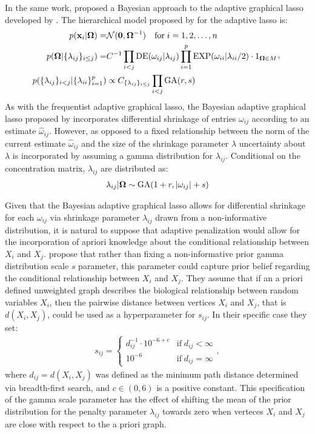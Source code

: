 \begin{DoubleSpace*}
In the same work, \cite{wang2012} proposed a Bayesian approach to the adaptive graphical lasso developed by \cite{fan2009}. The hierarchical model proposed by for the adaptive lasso is:
\begin{align}
p(\mathbf{x}_i|\boldsymbol{\Omega}) = & \mathcal{N}(\mathbf{0,\boldsymbol{\Omega}}^{-1}) \quad \text{for} \; i=1,2,\hdots,n\\
p(\boldsymbol{\Omega}|\{\lambda_{ij}\}_{i\leq j}) = & C^{-1} \prod_{i<j} \operatorname{DE}(\omega_{ij}|\lambda_{ij}) \prod_{i=1}^{p} \operatorname{EXP} (\omega_{ii} | \lambda_{ii} / 2) \cdot 1_{\boldsymbol{\Omega}\in M^+}\\
p(\{\lambda_{ij}\}_{i<j}|\{\lambda_{ii}\}_{i=1}^p) &\propto C_{\{\lambda_{ij}\}_{i\leq j}} \prod_{i<j} \operatorname{GA}(r,s)
\end{align}
As with the frequentist adaptive graphical lasso, the Bayesian adaptive graphical lasso proposed by \cite{wang2012} incorporates differential shrinkage of entries $\omega_{ij}$ according to an estimate $\hat{\omega}_{ij}$. However, as opposed to a fixed relationship between the norm of the current estimate $\hat{\omega}_{ij}$ and the size of the shrinkage parameter $\lambda$ uncertainty about $\lambda$ is incorporated by assuming a gamma distribution for $\lambda_{ij}$. Conditional on the concentration matrix, $\lambda_{ij}$ are distributed as:
\begin{align}
\lambda_{ij}|\boldsymbol{\Omega}\sim \operatorname{GA}(1+r,|\omega_{ij}|+s)
\end{align}

Given that the Bayesian adaptive graphical lasso allows for differential shrinkage for each $\omega_{ij}$ via shrinkage parameter $\lambda_{ij}$ drawn from a non-informative distribution, it is natural to suppose that adaptive penalization would allow for the incorporation of apriori knowledge about the conditional relationship between $X_i$ and $X_j$. \cite{peterson2013} propose that rather than fixing a non-informative prior gamma distribution scale $s$ parameter, this parameter could capture prior belief regarding the conditional relationship between $X_i$ and $X_j$. They assume that if an a priori defined unweighted graph describes the biological relationship between random variables $X_i$, then  the pairwise distance between vertices $X_i$ and $X_j$, that is $d(X_i,X_j)$, could be used as a hyperparameter for $s_{ij}$. In their specific case they set:
\begin{align}
s_{ij}=
\begin{cases} 
d_{ij}^{-1} \cdot  10^{-6+c} & \text{if} \; d_{ij}<\infty \\
10^{-6} & \text{if} \; d_{ij}=\infty
\end{cases},
\end{align}
where $d_{ij}=d(X_i,X_j)$ was defined as the minimum path distance determined via breadth-first search, and $c\in (0,6)$ is a positive constant. This specification of the gamma scale parameter has the effect of shifting the mean of the prior distribution for the penalty parameter $\lambda_{ij}$ towards zero when verteces $X_i$ and $X_j$ are close with respect to the a priori graph.


\end{DoubleSpace*}
